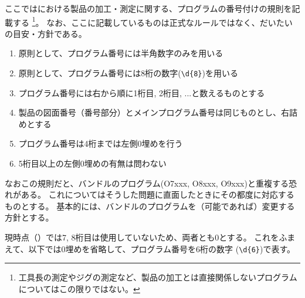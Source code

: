 

ここでは\DMname における製品の加工・測定に関する、プログラムの番号付けの規則を記載する
\footnote{工具長の測定やジグの測定など、製品の加工とは直接関係しないプログラムについてはこの限りではない。}。
なお、ここに記載しているものは正式なルールではなく、だいたいの目安・方針である。
\begin{enumerate}[label=\Roman*., ref=\Roman*)]
\item 原則として、プログラム番号には半角数字のみを用いる
\item 原則として、プログラム番号には8桁の数字(\verb|\d{8}|)を用いる
\item プログラム番号には右から順に1桁目, 2桁目, ...と数えるものとする
\item 製品の図面番号（番号部分）とメインプログラム番号は同じものとし、右詰めとする
\item プログラム番号は4桁までは左側0埋めを行う
\item 5桁目以上の左側0埋めの有無は問わない
\end{enumerate}
なおこの規則だと、バンドルのプログラム(O7xxx, O8xxx, O9xxx)と重複する恐れがある。
これについてはそうした問題に直面したときにその都度に対応するものとする。
基本的には、バンドルのプログラムを（可能であれば）変更する方針とする。



現時点（\customtodayap）では7, 8桁目は使用していないため、両者とも0とする。
これをふまえて、以下では0埋めを省略して、プログラム番号を6桁の数字 (\verb|\d{6}|)で表す。


